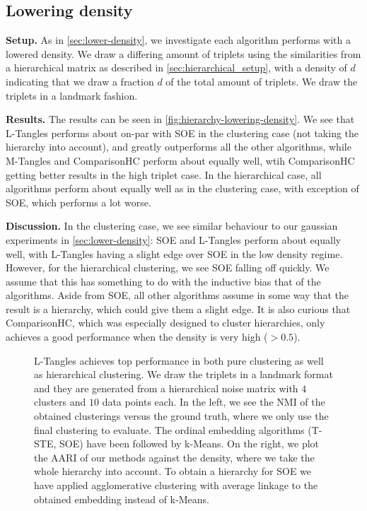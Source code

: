 \subsection{Lowering density}\label{sec:hierarchicall-lower-density}
\textbf{Setup.} As in \autoref{sec:lower-density}, we investigate each algorithm performs with a lowered density. We draw a differing amount of triplets
using the similarities from a hierarchical matrix as described in \autoref{sec:hierarchical_setup}, with a density of $d$ indicating that we draw a fraction $d$ of the total amount of triplets.
We draw the triplets in a landmark fashion. 

\noindent
\textbf{Results.}
The results can be seen in \autoref{fig:hierarchy-lowering-density}. 
We see that L-Tangles performs about on-par with SOE in the clustering case (not taking the hierarchy into account), 
and greatly outperforms all the other algorithms, while M-Tangles and ComparisonHC perform about equally well, wtih ComparisonHC getting better results in the high triplet case.
In the hierarchical case, all algorithms perform about equally well as in the clustering case, with exception of SOE, which performs a lot worse.

\noindent
\textbf{Discussion.}
In the clustering case, we see similar behaviour to our gaussian experiments in \autoref{sec:lower-density}: 
SOE and L-Tangles perform about equally well, with L-Tangles having a slight edge over SOE in the low density regime. However, for the hierarchical clustering, we see SOE falling off quickly.
We assume that this has something to do with the inductive bias that of the algorithms. Aside from SOE, all other algorithms assume in some way that the result is a hierarchy, which could give
them a slight edge. It is also curious that ComparisonHC, which was especially designed to cluster hierarchies, only achieves a good performance when the density is very high ($>0.5$).

\onecolumn
\begin{figure}[ht]
    \centering
    \caption{
        L-Tangles achieves top performance in both pure clustering as well as hierarchical clustering. 
        We draw the triplets in a landmark format and they are generated from a hierarchical noise matrix with $4$ clusters and $10$ data points each. In the left, we see the NMI of 
        the obtained clusterings versus the ground truth, where we only use the final clustering to evaluate. The ordinal embedding algorithms
        (T-STE, SOE) have been followed by k-Means. On the right, 
        we plot the AARI of our methods against the density, where we take the whole hierarchy into account. To obtain a hierarchy for SOE
        we have applied agglomerative clustering with average linkage to the obtained embedding instead of k-Means.
    }
    \label{fig:hierarchy-lowering-density}
\end{figure}

